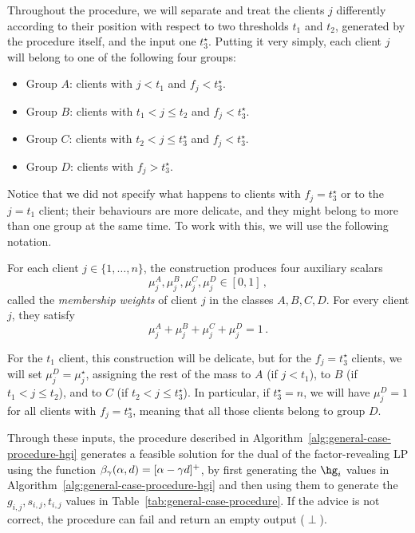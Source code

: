 Throughout the procedure, we will separate and treat the clients $j$ differently according to their position with respect to two thresholds $t_1$ and $t_2$, generated by the procedure itself, and the input one $t_3^\star$. Putting it very simply, each client $j$ will belong to one of the following four groups:
\begin{itemize}
    \item Group $A$: clients with $j < t_1$ and $f_j< t_3^\star$.
    \item Group $B$: clients with $t_1 < j \le t_2$ and $f_j< t_3^\star$.
    \item Group $C$: clients with $t_2 < j \le t_3^\star$ and $f_j< t_3^\star$.
    \item Group $D$: clients with $f_j > t_3^\star$.
\end{itemize}
Notice that we did not specify what happens to clients with $f_j = t_3^\star$ or to the $j=t_1$ client; their behaviours are more delicate, and they might belong to more than one group at the same time. To work with this, we will use the following notation.
\begin{definition}
    For each client $j\in\{1,\dots,n\}$, the construction produces four auxiliary scalars
    \begin{equation*}
        \mu_j^A,\mu_j^B,\mu_j^C,\mu_j^D\in[0,1]\,,
    \end{equation*}
    called the \emph{membership weights} of client $j$ in the classes $A,B,C,D$. For every client $j$, they satisfy
    \begin{equation*}
        \mu_j^A+\mu_j^B+\mu_j^C+\mu_j^D=1\,.
    \end{equation*}
\end{definition}
For the $t_1$ client, this construction will be delicate, but for the $f_j=t_3^\star$ clients, we will set $\mu_j^D=\mu_j^\star$, assigning the rest of the mass to $A$ (if $j<t_1$), to $B$ (if $t_1<j\le t_2$), and to $C$ (if $t_2<j\le t_3^\star$). In particular, if $t_3^\star=n$, we will have $\mu_j^D=1$ for all clients with $f_j=t_3^\star$, meaning that all those clients belong to group $D$.

Through these inputs, the procedure described in Algorithm~\ref{alg:general-case-procedure-hgi} generates a feasible solution for the dual of the factor-revealing LP using the function $\beta_{\gamma}(\alpha,d) = [\alpha - \gamma d]^+$, by first generating the $\hg_i$ values in Algorithm~\ref{alg:general-case-procedure-hgi} and then using them to generate the $g_{i,j}, s_{i,j}, t_{i,j}$ values in Table~\ref{tab:general-case-procedure}. If the advice is not correct, the procedure can fail and return an empty output ($\perp$). 

